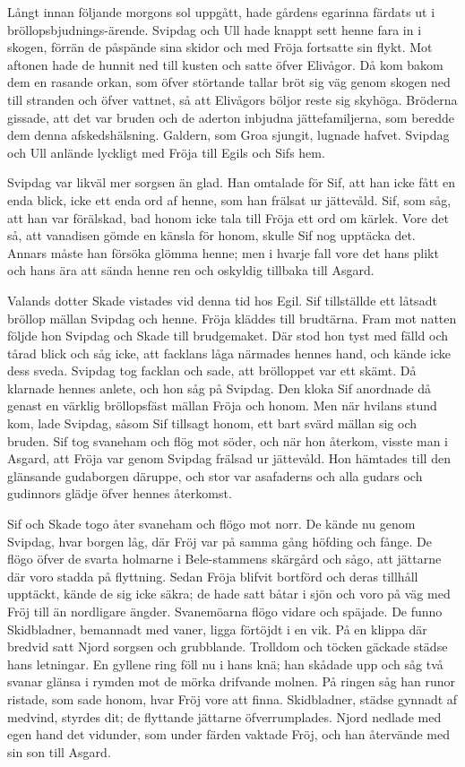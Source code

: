 Långt innan följande morgons sol uppgått, hade gårdens egarinna färdats
ut i bröllopsbjudnings-ärende. Svipdag och Ull hade knappt sett henne
fara in i skogen, förrän de påspände sina skidor och med Fröja fortsatte
sin flykt. Mot aftonen hade de hunnit ned till kusten och satte öfver
Elivågor. Då kom bakom dem en rasande orkan, som öfver störtande tallar
bröt sig väg genom skogen ned till stranden och öfver vattnet, så att
Elivågors böljor reste sig skyhöga. Bröderna gissade, att det var bruden
och de aderton inbjudna jättefamiljerna, som beredde dem denna
afskedshälsning. Galdern, som Groa sjungit, lugnade hafvet. Svipdag och
Ull anlände lyckligt med Fröja till Egils och Sifs hem.

Svipdag var likväl mer sorgsen än glad. Han omtalade för Sif, att han
icke fått en enda blick, icke ett enda ord af henne, som han frälsat ur
jättevåld. Sif, som såg, att han var förälskad, bad honom icke tala till
Fröja ett ord om kärlek. Vore det så, att vanadisen gömde en känsla för
honom, skulle Sif nog upptäcka det. Annars måste han försöka glömma
henne; men i hvarje fall vore det hans plikt och hans ära att sända
henne ren och oskyldig tillbaka till Asgard.

Valands dotter Skade vistades vid denna tid hos Egil. Sif tillställde
ett låtsadt bröllop mällan Svipdag och henne. Fröja kläddes till
brudtärna. Fram mot natten följde hon Svipdag och Skade till
brudgemaket. Där stod hon tyst med fälld och tårad blick och såg icke,
att facklans låga närmades hennes hand, och kände icke dess sveda.
Svipdag tog facklan och sade, att brölloppet var ett skämt. Då klarnade
hennes anlete, och hon såg på Svipdag. Den kloka Sif anordnade då genast
en värklig bröllopsfäst mällan Fröja och honom. Men när hvilans stund
kom, lade Svipdag, såsom Sif tillsagt honom, ett bart svärd mällan sig
och bruden. Sif tog svaneham och flög mot söder, och när hon återkom,
visste man i Asgard, att Fröja var genom Svipdag frälsad ur jättevåld.
Hon hämtades till den glänsande gudaborgen däruppe, och stor var
asafaderns och alla gudars och gudinnors glädje öfver hennes återkomst.

Sif och Skade togo åter svaneham och flögo mot norr. De kände nu genom
Svipdag, hvar borgen låg, där Fröj var på samma gång höfding och fånge.
De flögo öfver de svarta holmarne i Bele-stammens skärgård och sågo, att
jättarne där voro stadda på flyttning. Sedan Fröja blifvit bortförd och
deras tillhåll upptäckt, kände de sig icke säkra; de hade satt båtar i
sjön och voro på väg med Fröj till än nordligare ängder. Svanemöarna
flögo vidare och späjade. De funno Skidbladner, bemannadt med vaner,
ligga förtöjdt i en vik. På en klippa där bredvid satt Njord sorgsen och
grubblande. Trolldom och töcken gäckade städse hans letningar. En
gyllene ring föll nu i hans knä; han skådade upp och såg två svanar
glänsa i rymden mot de mörka drifvande molnen. På ringen såg han runor
ristade, som sade honom, hvar Fröj vore att finna. Skidbladner, städse
gynnadt af medvind, styrdes dit; de flyttande jättarne öfverrumplades.
Njord nedlade med egen hand det vidunder, som under färden vaktade Fröj,
och han återvände med sin son till Asgard.

